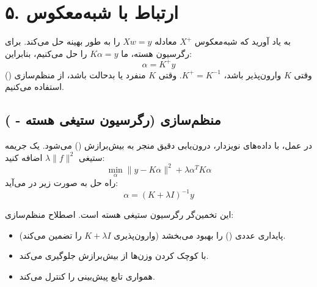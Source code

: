 \documentclass{article}
\begin{document}
\section*{۵. ارتباط با شبه‌معکوس}
به یاد آورید که شبه‌معکوس $X^+$ معادله $X w = y$ را به طور بهینه حل می‌کند. برای رگرسیون هسته، ما $K \alpha = y$ را حل می‌کنیم، بنابراین:
\[
\alpha = K^+ y
\]
وقتی $K$ وارون‌پذیر باشد، $K^+ = K^{-1}$. وقتی $K$ منفرد یا بدحالت باشد، از منظم‌سازی () استفاده می‌کنیم.

\subsection*{منظم‌سازی (رگرسیون ستیغی هسته - )}
در عمل، با داده‌های نویزدار، درون‌یابی دقیق منجر به بیش‌برازش () می‌شود. یک جریمه ستیغی $\lambda \|f\|^2$ اضافه کنید:
\[
\min_{\alpha} \|y - K \alpha\|^2 + \lambda \alpha^T K \alpha
\]
راه حل به صورت زیر در می‌آید:
\[
\alpha = (K + \lambda I)^{-1} y
\]

این تخمین‌گر رگرسیون ستیغی هسته است. اصطلاح منظم‌سازی:
\begin{itemize}
    \item پایداری عددی () را بهبود می‌بخشد (وارون‌پذیری $K + \lambda I$ را تضمین می‌کند).
    \item با کوچک کردن وزن‌ها از بیش‌برازش جلوگیری می‌کند.
    \item همواری تابع پیش‌بینی را کنترل می‌کند.
\end{itemize}
\end{document}
